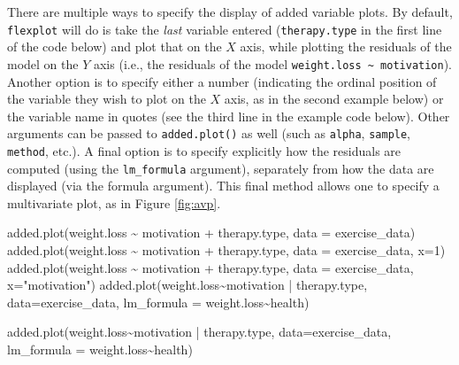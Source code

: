 \documentclass[
  english,
  man]{apa6}
\newenvironment{Shaded}{\begin{snugshade}}{\end{snugshade}}
\newcommand{\AttributeTok}[1]{\textcolor[rgb]{0.77,0.63,0.00}{#1}}
\newcommand{\DecValTok}[1]{\textcolor[rgb]{0.00,0.00,0.81}{#1}}
\newcommand{\FunctionTok}[1]{\textcolor[rgb]{0.00,0.00,0.00}{#1}}
\newcommand{\NormalTok}[1]{#1}
\newcommand{\SpecialCharTok}[1]{\textcolor[rgb]{0.00,0.00,0.00}{#1}}
\newcommand{\StringTok}[1]{\textcolor[rgb]{0.31,0.60,0.02}{#1}}
\begin{document}
There are multiple ways to specify the display of added variable plots. By default, \texttt{flexplot} will do is take the \emph{last} variable entered (\texttt{therapy.type} in the first line of the code below) and plot that on the \(X\) axis, while plotting the residuals of the model on the \(Y\) axis (i.e., the residuals of the model \texttt{weight.loss\ \textasciitilde{}\ motivation}). Another option is to specify either a number (indicating the ordinal position of the variable they wish to plot on the \(X\) axis, as in the second example below) or the variable name in quotes (see the third line in the example code below). Other arguments can be passed to \texttt{added.plot()} as well (such as \texttt{alpha}, \texttt{sample}, \texttt{method}, etc.). A final option is to specify explicitly how the residuals are computed (using the \texttt{lm\_formula} argument), separately from how the data are displayed (via the formula argument). This final method allows one to specify a multivariate plot, as in Figure \ref{fig:avp}.

\begin{Shaded}
\begin{Highlighting}[]
\FunctionTok{added.plot}\NormalTok{(weight.loss }\SpecialCharTok{\textasciitilde{}}\NormalTok{ motivation }\SpecialCharTok{+}\NormalTok{ therapy.type, }\AttributeTok{data =}\NormalTok{ exercise\_data)}
\FunctionTok{added.plot}\NormalTok{(weight.loss }\SpecialCharTok{\textasciitilde{}}\NormalTok{ motivation }\SpecialCharTok{+}\NormalTok{ therapy.type, }\AttributeTok{data =}\NormalTok{ exercise\_data, }\AttributeTok{x=}\DecValTok{1}\NormalTok{) }
\FunctionTok{added.plot}\NormalTok{(weight.loss }\SpecialCharTok{\textasciitilde{}}\NormalTok{ motivation }\SpecialCharTok{+}\NormalTok{ therapy.type, }\AttributeTok{data =}\NormalTok{ exercise\_data, }\AttributeTok{x=}\StringTok{"motivation"}\NormalTok{) }
\FunctionTok{added.plot}\NormalTok{(weight.loss}\SpecialCharTok{\textasciitilde{}}\NormalTok{motivation }\SpecialCharTok{|}\NormalTok{ therapy.type, }\AttributeTok{data=}\NormalTok{exercise\_data, }
           \AttributeTok{lm\_formula =}\NormalTok{ weight.loss}\SpecialCharTok{\textasciitilde{}}\NormalTok{health)}
\end{Highlighting}
\end{Shaded}

\small

\begin{Shaded}
\begin{Highlighting}[]
\FunctionTok{added.plot}\NormalTok{(weight.loss}\SpecialCharTok{\textasciitilde{}}\NormalTok{motivation }\SpecialCharTok{|}\NormalTok{ therapy.type, }\AttributeTok{data=}\NormalTok{exercise\_data, }
           \AttributeTok{lm\_formula =}\NormalTok{ weight.loss}\SpecialCharTok{\textasciitilde{}}\NormalTok{health)}
\end{Highlighting}
\end{Shaded}
\end{document}
